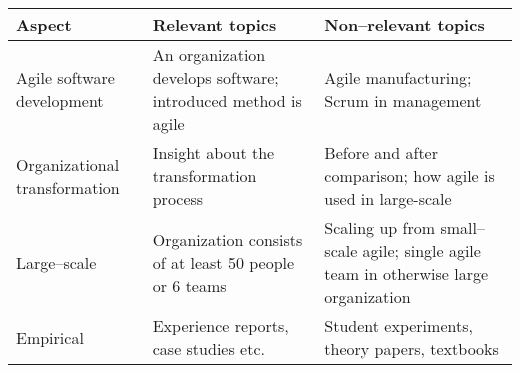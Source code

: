 \centering

 \label{inclusioncriteriatable}
\begin{tabular}{p{10em} p{16em} p{16em}}
	\bfseries{Aspect} & \bfseries{Relevant topics} & \bfseries{Non–relevant topics} \\
	\hline
	Agile software development & An organization develops software; introduced
	method is agile & Agile manufacturing; Scrum in management \\
	Organizational transformation & Insight about the transformation process &
	Before and after comparison; how agile is used in large-scale \\
	Large–scale & Organization consists of at least 50 people or 6 teams &
	Scaling up from small–scale agile; single agile team in otherwise large
	organization \\
	Empirical & Experience reports, case studies etc. & Student experiments,
	theory papers, textbooks \\
\end{tabular}

\justify
